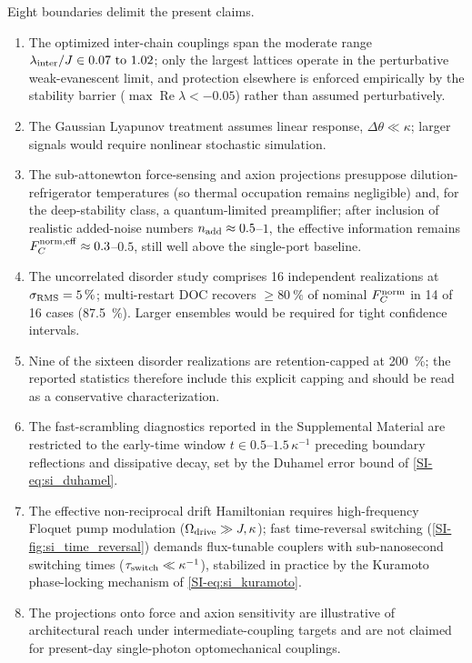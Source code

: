 \documentclass[aps,prxquantum,preprint,superscriptaddress,amsmath,amssymb]{revtex4-2}
\newcommand{\Real}{\operatorname{Re}}
\newcommand{\Fnorm}{F_C^{\rm norm}}
\newcommand{\Fnormeff}{F_C^{\rm norm,eff}}
\newcommand{\lint}{\lambda_{\rm inter}}
\begin{document}
Eight boundaries delimit the present claims.
\begin{enumerate}
\item The optimized inter-chain couplings span the moderate range $\lint/J\in\numrange{0.07}{1.02}$; only the largest lattices operate in the perturbative weak-evanescent limit, and protection elsewhere is enforced empirically by the stability barrier ($\max\Real\lambda<\num{-0.05}$) rather than assumed perturbatively.
\item The Gaussian Lyapunov treatment assumes linear response, $\Delta\theta\ll\kappa$; larger signals would require nonlinear stochastic simulation.
\item The sub-attonewton force-sensing and axion projections presuppose dilution-refrigerator temperatures (so thermal occupation remains negligible) and, for the deep-stability class, a quantum-limited preamplifier; after inclusion of realistic added-noise numbers $n_{\rm add}\approx\num{0.5}$--$\num{1}$, the effective information remains $\Fnormeff\approx\num{0.3}$--$\num{0.5}$, still well above the single-port baseline.
\item The uncorrelated disorder study comprises 16 independent realizations at $\sigma_{\rm RMS}=\qty{5}{\percent}$; multi-restart DOC recovers $\ge\qty{80}{\percent}$ of nominal $\Fnorm$ in 14 of 16 cases (\qty{87.5}{\percent}). Larger ensembles would be required for tight confidence intervals.
\item Nine of the sixteen disorder realizations are retention-capped at \qty{200}{\percent}; the reported statistics therefore include this explicit capping and should be read as a conservative characterization.
\item The fast-scrambling diagnostics reported in the Supplemental Material are restricted to the early-time window $t\in\numrange{0.5}{1.5}\,\kappa^{-1}$ preceding boundary reflections and dissipative decay, set by the Duhamel error bound of \cref{SI-eq:si_duhamel}.
\item The effective non-reciprocal drift Hamiltonian requires high-frequency Floquet pump modulation ($\Omega_{\rm drive}\gg J,\kappa$); fast time-reversal switching (\cref{SI-fig:si_time_reversal}) demands flux-tunable couplers with sub-nanosecond switching times ($\tau_{\rm switch}\ll\kappa^{-1}$), stabilized in practice by the Kuramoto phase-locking mechanism of \cref{SI-eq:si_kuramoto}.
\item The projections onto force and axion sensitivity are illustrative of architectural reach under intermediate-coupling targets and are not claimed for present-day single-photon optomechanical couplings.
\end{enumerate}
\end{document}
